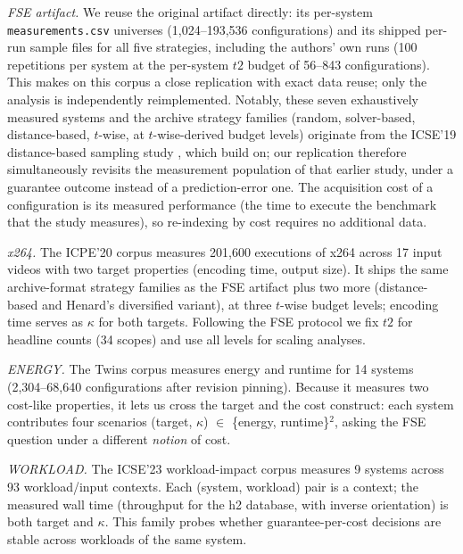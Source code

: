 \emph{FSE artifact.} We reuse the original artifact
\citep{weis2026artifact} directly: its per-system
\texttt{measurements.csv} universes (1{,}024--193{,}536 configurations)
and its shipped per-run sample files for all five strategies, including
the authors' own \srs{} runs (100 repetitions per system at the
per-system $t2$ budget of 56--843 configurations). This makes \rqone{} on
this corpus a close replication with exact data reuse; only the analysis
is independently reimplemented. Notably, these seven exhaustively
measured systems and the archive strategy families (random,
solver-based, distance-based, $t$-wise, at $t$-wise-derived budget
levels) originate from the ICSE'19 distance-based sampling study
\citep{kaltenecker2019distance}, which \citet{weis2026risk} build on; our
replication therefore simultaneously revisits the measurement population
of that earlier study, under a guarantee outcome instead of a
prediction-error one. The acquisition cost of a configuration is its
measured performance (the time to execute the benchmark that the study
measures), so re-indexing by cost requires no additional data.

\emph{x264.} The ICPE'20 corpus \citep{pereira2020sampling} measures
201{,}600 executions of x264 across 17 input videos with two target
properties (encoding time, output size). It ships the same
archive-format strategy families as the FSE artifact plus two more
(distance-based and Henard's diversified variant), at three $t$-wise
budget levels; encoding time serves as $\kappa$ for both targets.
Following the FSE protocol we fix $t2$ for headline counts (34 scopes)
and use all levels for scaling analyses.

\emph{ENERGY.} The Twins corpus \citep{weber2023twins} measures energy
and runtime for 14 systems (2{,}304--68{,}640 configurations after
revision pinning). Because it measures two cost-like properties, it lets
us cross the target and the cost construct: each system contributes four
scenarios (target, $\kappa$) $\in$ \{energy, runtime\}$^2$, asking the
FSE question under a different \emph{notion} of cost.

\emph{WORKLOAD.} The ICSE'23 workload-impact corpus
\citep{muehlbauer2023workload} measures 9 systems across 93
workload/input contexts. Each (system, workload) pair is a context;
the measured wall time (throughput for the h2 database, with inverse
orientation) is both target and $\kappa$. This family probes whether
guarantee-per-cost decisions are stable across workloads of the same
system.

